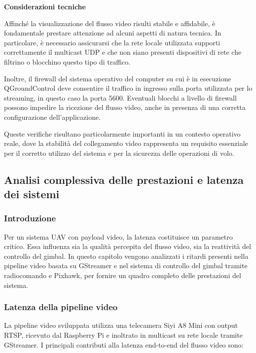 \bigskip
\noindent \textbf{Considerazioni tecniche}
\bigskip

Affinché la visualizzazione del flusso video risulti stabile e affidabile, è fondamentale prestare attenzione ad alcuni aspetti di natura tecnica.
In particolare, è necessario assicurarsi che la rete locale utilizzata supporti correttamente il multicast UDP e che non siano presenti dispositivi di rete che filtrino o blocchino questo tipo di traffico.

Inoltre, il firewall del sistema operativo del computer su cui è in esecuzione QGroundControl deve consentire il traffico in ingresso sulla porta utilizzata per lo streaming, in questo caso la porta 5600.
Eventuali blocchi a livello di firewall possono impedire la ricezione del flusso video, anche in presenza di una corretta configurazione dell’applicazione.

Queste verifiche risultano particolarmente importanti in un contesto operativo reale, dove la stabilità del collegamento video rappresenta un requisito essenziale per il corretto utilizzo del sistema e per la sicurezza delle operazioni di volo.

\subsection{Analisi complessiva delle prestazioni e latenza dei sistemi}

\subsubsection{Introduzione}
Per un sistema UAV con payload video, la latenza costituisce un parametro critico.  
Essa influenza sia la qualità percepita del flusso video, sia la reattività del controllo del gimbal.  
In questo capitolo vengono analizzati i ritardi presenti nella pipeline video basata su GStreamer e nel sistema di controllo del gimbal tramite radiocomando e Pixhawk, per fornire un quadro completo delle prestazioni del sistema.

\subsubsection{Latenza della pipeline video}

La pipeline video sviluppata utilizza una telecamera Siyi A8 Mini con output RTSP, ricevuto dal Raspberry Pi e inoltrato in multicast su rete locale tramite GStreamer.  
I principali contributi alla latenza end-to-end del flusso video sono:

